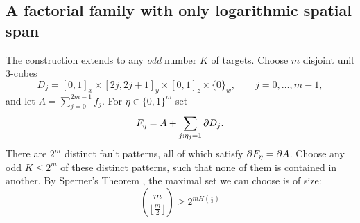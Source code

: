 \documentclass[manuscript,screen,review]{acmart}
\begin{document}
%
%
\subsection{A factorial family with only logarithmic spatial span}
The construction extends to any \emph{odd} number $K$ of targets. Choose $m$ disjoint unit 3-cubes
\[
 D_j=[0,1]_x\times[2j,2j+1]_y\times[0,1]_z\times\{0\}_w,
 \qquad j=0,\ldots,m-1,
\]
and let $A=\sum_{j=0}^{2m-1}f_j$. For $\eta\in\{0,1\}^m$ set
\begin{equation}\label{eq:binary}
 F_\eta=A+\sum_{j:\eta_j=1}\partial D_j.
\end{equation}
There are $2^m$ distinct fault patterns, all of which satisfy $\partial F_\eta=\partial A$. Choose any odd $K\le 2^m$ of these distinct patterns, such that none of them is contained in another. By Sperner's Theorem \cite{Sperner1928}, the maximal set we can choose is of size:
\[
  { m \choose \lfloor  \frac{m}{2} \rfloor } \ge 2^{m H(\frac{1}{3})}
\]
\end{document}
